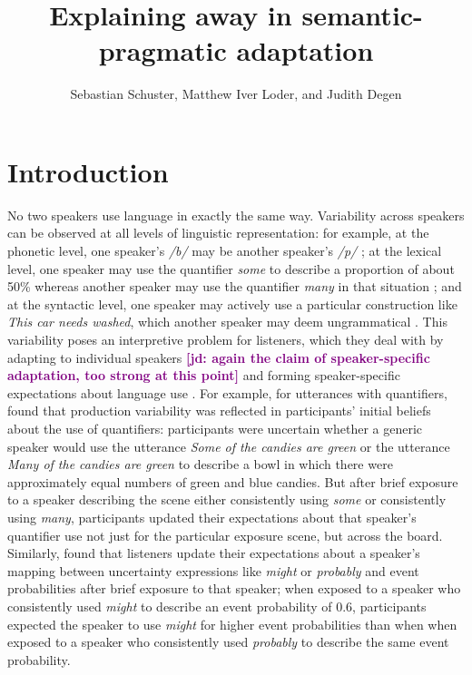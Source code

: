 \documentclass[man,floatsintext]{apa6}
\title{Explaining away in semantic-pragmatic adaptation}
\author{Sebastian Schuster, Matthew Iver Loder, and Judith Degen}
\affiliation{Department of Linguistics, Stanford University}
\newcommand{\jd}[1]{\textcolor{Purple}{\bf [jd: #1]}}
\begin{document}
\maketitle



\section{Introduction}

No two speakers use language in exactly the same way. Variability across speakers can be observed at all levels of linguistic representation: for example, at the phonetic level, one speaker's \emph{/b/} may be another speaker's \emph{/p/} \cite{Kleinschmidt2015}; at the lexical level, one speaker may use the  quantifier \textit{some} to describe a proportion of about 50\% whereas another speaker may use the quantifier \textit{many} in that situation \cite{Yildirim2016}; and at the syntactic level, one speaker may actively use a particular construction like \emph{This car needs washed}, which another speaker may deem ungrammatical \cite{Kaschak2004}. This variability poses an interpretive problem for listeners, which they deal with  by adapting to individual speakers \jd{again the claim of speaker-specific adaptation, too strong at this point} and forming speaker-specific expectations about language use \cite[inter alia]{Norris2003,Kraljic2005,Bradlow2008,Kurumada2012,Kamide2012,Kleinschmidt2015,Fine2016,Roettger2019}. For example, for utterances with quantifiers,   found that production variability was reflected in participants' initial beliefs about the use of quantifiers: participants were uncertain whether a generic speaker would use the utterance \textit{Some of the candies are green} or the utterance \textit{Many of the candies are green} to describe a bowl in which there were approximately equal numbers of green and blue candies. But after brief exposure to a speaker describing the scene either consistently using \textit{some} or consistently using \textit{many}, participants updated their expectations about that speaker's  quantifier use not just for the particular exposure scene, but across the board. Similarly,  found that listeners update their expectations about a speaker's mapping between uncertainty expressions like \textit{might} or \textit{probably} and event probabilities after brief exposure to that speaker; when exposed to a speaker who consistently used \textit{might} to describe an event probability of 0.6, participants expected the speaker to use \textit{might} for higher event probabilities than when when exposed to a speaker who consistently used \textit{probably} to describe the same event probability.
\end{document}
